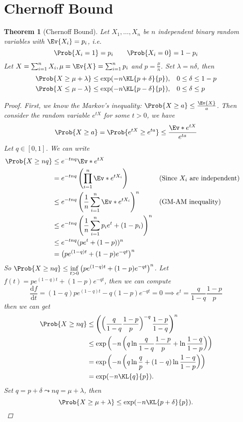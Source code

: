 \documentclass[a4paper]{article}
\theoremstyle{mystyle}
\newtheorem{theorem}{Theorem}
\begin{document}
\section{Chernoff Bound}
\begin{theorem}[Chernoff Bound]
  Let $X_1, \dots, X_n$ be $n$ independent binary random variables with
  $\Ev{X_i} = p_i$, i.e.
  \[
      \Prob{X_i = 1} = p_i \qquad \Prob{X_i = 0} = 1 - p_i
  \]
  Let $X = \sum_{i=1}^n X_i, \mu = \Ev{X} = \sum_{i=1}^n p_i$ and $p = \frac{\mu}{n}$.
  Set $\lambda = n\delta$, then
  \begin{align*}
    \Prob{ X \ge \mu + \lambda } \le \exp(-n \KL{p+\delta}{p}), & \quad
    0 \le \delta \le 1 - p \\
    \Prob{ X \le \mu - \lambda } \le \exp(-n \KL{p-\delta}{p}), & \quad
    0 \le \delta \le p
  \end{align*}

  \begin{proof}
    First, we know the Markov's inequality: $\Prob{X \ge a} \le \frac{\Ev{X}}{a}$.
    Then consider the random variable $e^{tX}$ for some $t > 0$, we have
    \[
      \Prob{X \ge a} = \Prob{e^{tX} \ge e^{ta}} \le \frac{\Ev*{e^{tX}}}{e^{ta}}
    \]
    Let $q \in [0, 1]$. We can write
    \begin{align*}
      \Prob{X \ge nq} &\le e^{-tnq} \Ev*{e^{tX}} \\
                     &= e^{-tnq} \left( \prod_{i=1}^n \Ev*{e^{tX_i}} \right)
                     && \text{(Since $X_i$ are independent)}\\
                     &\le e^{-tnq} \left(\frac{1}{n} \sum_{i=1}^n \Ev*{e^{tX_i}} \right)^n
                     && \text{(GM-AM inequality)}\\
                     &\le e^{-tnq} \left(\frac{1}{n} \sum_{i=1}^n p_i e^t + (1 - p_i) \right)^n \\
                     &\le e^{-tnq} (p e^t + (1 - p))^n \\
                     &= \big(p e^{(1-q)t} + (1-p)e^{-qt}\big)^n
    \end{align*}
    So $\Prob{X \ge nq} \le \inf\limits_{t > 0} \big(p e^{(1-q)t} + (1-p)e^{-qt}\big)^n$.
    Let $f(t) = p e^{(1-q)t} + (1-p)e^{-qt}$, then we can compute
    \[
      \frac{\mathrm{d} f}{\mathrm{d} t}
      = (1-q)p e^{(1-q)t} - q(1-p)e^{-qt} = 0
      \implies 
      e^t = \frac{q}{1-q}\frac{1-p}{p}
    \]
    then we can get
    \begin{align*}
      \Prob{X \ge nq}
      &\le \left(\left(\frac{q}{1-q}\frac{1-p}{p} \right)^{-q} \frac{1-p}{1-q}\right)^n \\
      &\le \exp \left( -n \left( q \ln \frac{q}{1-q}\frac{1-p}{p} + \ln \frac{1-q}{1-p} \right)\right)\\
      &= \exp \left( -n \left( q \ln \frac{q}{p} + (1-q) \ln \frac{1-q}{1-p} \right)\right)\\
      &= \exp(-n \KL{q}{p}).
    \end{align*}
    Set $q = p + \delta \leadsto nq = \mu + \lambda$, then
    \[
      \Prob{X \ge \mu + \lambda} \le \exp(-n \KL{p+\delta}{p}).  \qedhere
    \]
  \end{proof}
\end{theorem}
\end{document}
